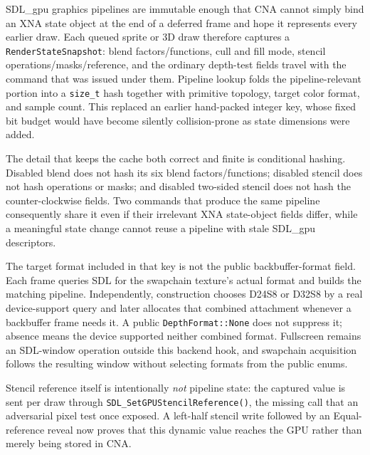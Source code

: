 SDL\_gpu graphics pipelines are immutable enough that CNA cannot simply bind an XNA state object
at the end of a deferred frame and hope it represents every earlier draw. Each queued sprite or
3D draw therefore captures a \texttt{RenderStateSnapshot}: blend factors/functions, cull and
fill mode, stencil operations/masks/reference, and the ordinary depth-test fields travel with
the command that was issued under them. Pipeline lookup folds the pipeline-relevant portion into
a \texttt{size\_t} hash together with primitive topology, target color format, and sample count.
This replaced an earlier hand-packed integer key, whose fixed bit budget would have become
silently collision-prone as state dimensions were added.

The detail that keeps the cache both correct and finite is conditional hashing. Disabled blend
does not hash its six blend factors/functions; disabled stencil does not hash operations or masks;
and disabled two-sided stencil does not hash the counter-clockwise fields. Two commands that
produce the same pipeline consequently share it even if their irrelevant XNA state-object fields
differ, while a meaningful state change cannot reuse a pipeline with stale SDL\_gpu descriptors.

\begin{sourcenote}
The target format included in that key is not the public backbuffer-format field. Each frame
queries SDL for the swapchain texture's actual format and builds the matching pipeline.
Independently, construction chooses D24S8 or D32S8 by a real device-support query and later allocates that
combined attachment whenever a backbuffer frame needs it. A public
\texttt{DepthFormat::None} does not suppress it; absence means the device supported neither
combined format. Fullscreen remains an SDL-window operation outside this backend hook, and
swapchain acquisition follows the resulting window without selecting formats from the public
enums.
\end{sourcenote}
Stencil reference itself is intentionally \emph{not} pipeline state: the captured value is sent
per draw through \texttt{SDL\_SetGPUStencilReference()}, the missing call that an adversarial
pixel test once exposed. A left-half stencil write followed by an Equal-reference reveal now
proves that this dynamic value reaches the GPU rather than merely being stored in CNA.

